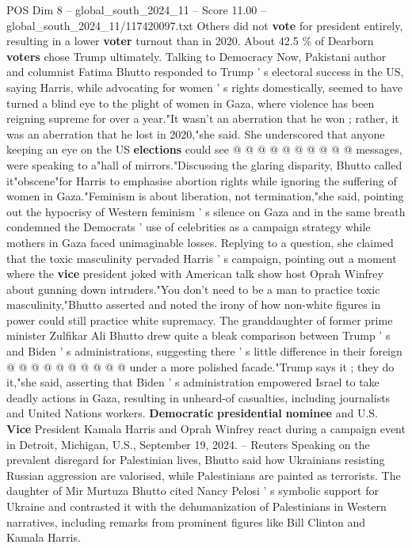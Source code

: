 \begin{textsample}{POS Dim 8 – global\_south\_2024\_11 – Score 11.00 – global\_south\_2024\_11/117420097.txt}
Others did not \textbf{vote} for president entirely, resulting in a lower \textbf{voter} turnout than in 2020.
About 42.5 \% of Dearborn \textbf{voters} chose Trump ultimately.
Talking to Democracy Now, Pakistani author and columnist Fatima Bhutto responded to Trump ' s electoral success in the US, saying Harris, while advocating for women ' s rights domestically, seemed to have turned a blind eye to the plight of women in Gaza, where violence has been reigning supreme for over a year."It wasn't an aberration that he won ; rather, it was an aberration that he lost in 2020,"she said.
She underscored that anyone keeping an eye on the US \textbf{elections} could see @ @ @ @ @ @ @ @ @ @ messages, were speaking to a"hall of mirrors."Discussing the glaring disparity, Bhutto called it"obscene"for Harris to emphasise abortion rights while ignoring the suffering of women in Gaza."Feminism is about liberation, not termination,"she said, pointing out the hypocrisy of Western feminism ' s silence on Gaza and in the same breath condemned the Democrats ' use of celebrities as a campaign strategy while mothers in Gaza faced unimaginable losses.
Replying to a question, she claimed that the toxic masculinity pervaded Harris ' s campaign, pointing out a moment where the \textbf{vice} president joked with American talk show host Oprah Winfrey about gunning down intruders."You don't need to be a man to practice toxic masculinity,"Bhutto asserted and noted the irony of how non-white figures in power could still practice white supremacy.
The granddaughter of former prime minister Zulfikar Ali Bhutto drew quite a bleak comparison between Trump ' s and Biden ' s administrations, suggesting there ' s little difference in their foreign @ @ @ @ @ @ @ @ @ @ under a more polished facade."Trump says it ; they do it,"she said, asserting that Biden ' s administration empowered Israel to take deadly actions in Gaza, resulting in unheard-of casualties, including journalists and United Nations workers. \textbf{Democratic} \textbf{presidential} \textbf{nominee} and U.S. \textbf{Vice} President Kamala Harris and Oprah Winfrey react during a campaign event in Detroit, Michigan, U.S., September 19, 2024. -- Reuters Speaking on the prevalent disregard for Palestinian lives, Bhutto said how Ukrainians resisting Russian aggression are valorised, while Palestinians are painted as terrorists.
The daughter of Mir Murtuza Bhutto cited Nancy Pelosi ' s symbolic support for Ukraine and contrasted it with the dehumanization of Palestinians in Western narratives, including remarks from prominent figures like Bill Clinton and Kamala Harris.

\end{textsample}
